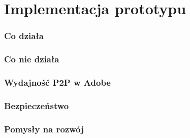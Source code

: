\chapter{Implementacja prototypu}
\label{cha:ImplementacjaPrototypu}

\subsection{Co działa}
\subsection{Co nie działa}
\subsection{Wydajność P2P w Adobe}
\subsection{Bezpieczeństwo}
\subsection{Pomysły na rozwój}

\newpage
